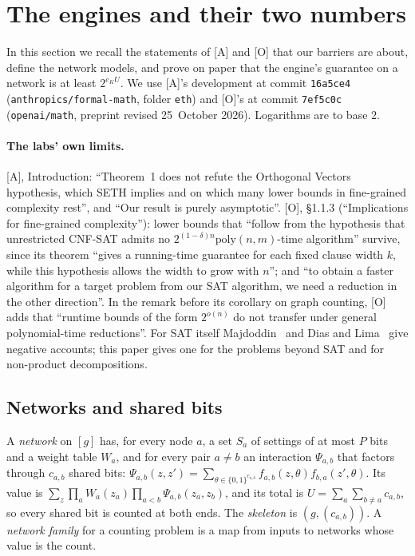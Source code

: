 \documentclass[10pt]{amsart}
\theoremstyle{plain}
\theoremstyle{definition}
\theoremstyle{remark}
\numberwithin{equation}{section}
\newcommand{\A}{\textup{[A]}}
\newcommand{\Oa}{\textup{[O]}}
\begin{document}
\section{The engines and their two numbers}\label{sec:engines}

In this section we recall the statements of \A{} and \Oa{} that our barriers are about, define the
network models, and prove on paper that the engine's guarantee on a network is at least
$2^{e_KU}$. We use \A's development at commit \texttt{16a5ce4} (\texttt{anthropics/formal-math},
folder \texttt{eth}) and \Oa's at commit \texttt{7ef5c0c} (\texttt{openai/math}, preprint revised
25~October 2026). Logarithms are to base $2$.

\paragraph{The labs' own limits.} \A, Introduction: ``Theorem~1 does not refute the Orthogonal Vectors
hypothesis, which SETH implies and on which many lower bounds in fine-grained complexity rest'', and
``Our result is purely asymptotic''. \Oa, \S1.1.3 (``Implications for fine-grained complexity''):
lower bounds that ``follow from the hypothesis that unrestricted CNF-SAT admits no
$2^{(1-\delta)n}\mathrm{poly}(n,m)$-time algorithm'' survive, since its theorem ``gives a
running-time guarantee for each fixed clause width $k$, while this hypothesis allows the width to
grow with $n$''; and ``to obtain a faster algorithm for a target problem from our SAT algorithm, we
need a reduction in the other direction''. In the remark before its corollary on graph counting,
\Oa{} adds that ``runtime bounds of the form $2^{o(n)}$ do not transfer under general polynomial-time
reductions''. For SAT itself Majdoddin~\cite{Maj26} and Dias and Lima~\cite{DL26} give negative
accounts; this paper gives one for the problems beyond SAT and for non-product decompositions.

\subsection{Networks and shared bits}
\begin{definition}[Networks; \A, Definition~2]\label{def:network}
A \emph{network} on $[g]$ has, for every node $a$, a set $S_a$ of settings of at most $P$ bits and a
weight table $W_a$, and for every pair $a\ne b$ an interaction $\Psi_{a,b}$ that factors through
$c_{a,b}$ shared bits: $\Psi_{a,b}(z,z')=\sum_{\theta\in\{0,1\}^{c_{a,b}}}f_{a,b}(z,\theta)f_{b,a}(z',\theta)$.
Its value is $\sum_{z}\prod_aW_a(z_a)\prod_{a<b}\Psi_{a,b}(z_a,z_b)$, and its total is
$U=\sum_a\sum_{b\ne a}c_{a,b}$, so every shared bit is counted at both ends. The \emph{skeleton} is
$(g,(c_{a,b}))$. A \emph{network family} for a counting problem is a map from inputs to networks
whose value is the count.
\end{definition}
\end{document}

